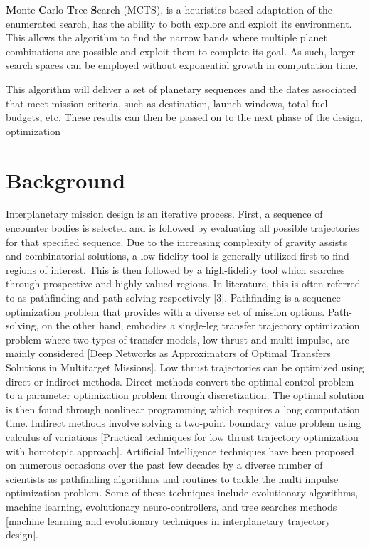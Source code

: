 \documentclass[letterpaper, preprint, paper,11pt]{AAS}	%
\begin{document}
\textbf{M}onte \textbf{C}arlo \textbf{T}ree \textbf{S}earch (MCTS), is a heuristics-based adaptation of the enumerated search, has the ability to both explore and exploit its environment. This allows the algorithm to find the narrow bands where multiple planet combinations are possible and exploit them to complete its goal. As such, larger search spaces can be employed without exponential growth in computation time.

This algorithm will deliver a set of planetary sequences and the dates associated that meet mission criteria, such as destination, launch windows, total fuel budgets, etc. These results can then be passed on to the next phase of the design, optimization 


\section{Background}

Interplanetary mission design is an iterative process. First, a sequence of encounter bodies is selected and is followed by evaluating all possible trajectories for that specified sequence. Due to the increasing complexity of gravity assists and combinatorial solutions, a low-fidelity tool is generally utilized first to find regions of interest. This is then followed by a high-fidelity tool which searches through prospective and highly valued regions.  In literature, this is often referred to as pathfinding and path-solving respectively [3]. Pathfinding is a sequence optimization problem that provides with a diverse set of mission options. Path-solving, on the other hand, embodies a single-leg transfer trajectory optimization problem where two types of transfer models, low-thrust and multi-impulse, are mainly considered [Deep Networks as Approximators of Optimal Transfers Solutions in Multitarget Missions]. Low thrust trajectories can be optimized using direct or indirect methods. Direct methods convert the optimal control problem to a parameter optimization problem through discretization. The optimal solution is then found through nonlinear programming which requires a long computation time. Indirect methods involve solving a two-point boundary value problem using calculus of variations [Practical techniques for low thrust trajectory optimization with homotopic approach]. Artificial Intelligence techniques have been proposed on numerous occasions over the past few decades by a diverse number of scientists as pathfinding algorithms and routines to tackle the multi impulse optimization problem. Some of these techniques include evolutionary algorithms, machine learning, evolutionary neuro-controllers, and tree searches methods [machine learning and evolutionary techniques in interplanetary trajectory design].    
\end{document}
